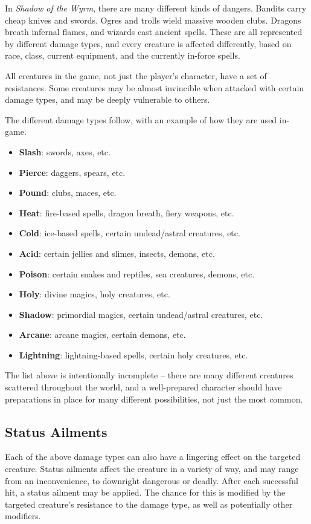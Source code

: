 In {\it Shadow of the Wyrm}, there are many different kinds of dangers.  
Bandits carry cheap knives and swords.  Ogres and trolls wield massive
wooden clubs.  Dragons breath infernal flames, and wizards cast ancient 
spells.  These are all represented by different damage types, and every 
creature is affected differently, based on race, class, current equipment, 
and the currently in-force spells.

All creatures in the game, not just the player's character, have a set of 
resistances.  Some creatures may be almost invincible when attacked with
certain damage types, and may be deeply vulnerable to others.

The different damage types follow, with an example of how they are used
in-game.

\begin{itemize}
\item {\bf Slash}: swords, axes, etc.
\item {\bf Pierce}: daggers, spears, etc.
\item {\bf Pound}: clubs, maces, etc.
\item {\bf Heat}: fire-based spells, dragon breath, fiery weapons, etc.
\item {\bf Cold}: ice-based spells, certain undead/astral creatures, etc.
\item {\bf Acid}: certain jellies and slimes, insects, demons, etc.
\item {\bf Poison}: certain snakes and reptiles, sea creatures, demons, etc.
\item {\bf Holy}: divine magics, holy creatures, etc.
\item {\bf Shadow}: primordial magics, certain undead/astral creatures, etc.
\item {\bf Arcane}: arcane magics, certain demons, etc.
\item {\bf Lightning}: lightning-based spells, certain holy creatures, etc.
\end{itemize}

The list above is intentionally incomplete -- there are many different
creatures scattered throughout the world, and a well-prepared character 
should have preparations in place for many different possibilities, not 
just the most common.

\subsection{Status Ailments}

Each of the above damage types can also have a lingering effect on the
targeted creature.  Status ailments affect the creature in a variety of
way, and may range from an inconvenience, to downright dangerous or
deadly.  After each successful hit, a status ailment may be applied.  The
chance for this is modified by the targeted creature's resistance to the
damage type, as well as potentially other modifiers.

